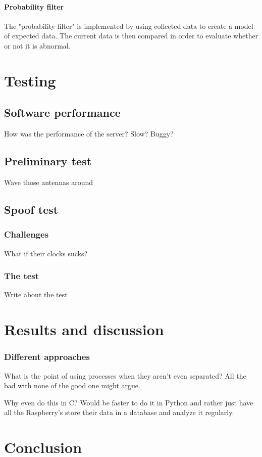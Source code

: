 \documentclass[12pt,english,a4paper]{report}
\begin{document}
\subsubsection{Probability filter}
The "probability filter" is implemented by using collected data to create a model of expected data. The current data is then compared in order to evaluate whether or not it is abnormal. 

\chapter{Testing}

\section{Software performance}
How was the performance of the server? Slow? Buggy?

\section{Preliminary test}
Wave those antennas around

\section{Spoof test}
\subsection{Challenges}
What if their clocks sucks?

\subsection{The test}
Write about the test

\chapter{Results and discussion}\label{discussion}

\subsection{Different approaches}
What is the point of using processes when they aren't even separated? All the bad with none of the good one might argue. 

Why even do this in C? Would be faster to do it in Python and rather just have all the Raspberry's store their data in a database and analyze it regularly. 

\chapter{Conclusion}




\newpage
\printbibliography[title={Complete Bibliography},heading=bibintoc]
\end{document}
